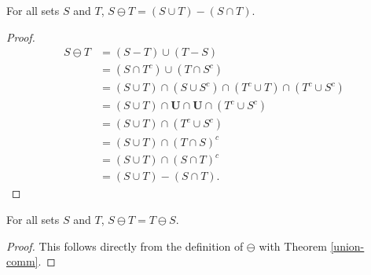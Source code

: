 \documentclass[../math.tex]{subfiles}
\begin{document}
\begin{theorem}
    For all sets $S$ and $T$, $S \ominus T = (S \cup T) - (S \cap T)$.
\end{theorem}
\begin{proof}
    \begin{align*}
        S \ominus T
        &= (S - T) \cup (T - S) \\
        &= (S \cap T^c) \cup (T \cap S^c) \\
        &= (S \cup T) \cap (S \cup S^c) \cap (T^c \cup T) \cap (T^c \cup S^c) \\
        &= (S \cup T) \cap \bm U \cap \bm U \cap (T^c \cup S^c) \\
        &= (S \cup T) \cap (T^c \cup S^c) \\
        &= (S \cup T) \cap (T \cap S)^c \\
        &= (S \cup T) \cap (S \cap T)^c \\
        &= (S \cup T) - (S \cap T).
    \end{align*}
\end{proof}

\begin{theorem}
    For all sets $S$ and $T$, $S \ominus T = T \ominus S$.
\end{theorem}
\begin{proof}
    This follows directly from the definition of $\ominus$ with Theorem
    \ref{union-comm}.
\end{proof}
\end{document}

